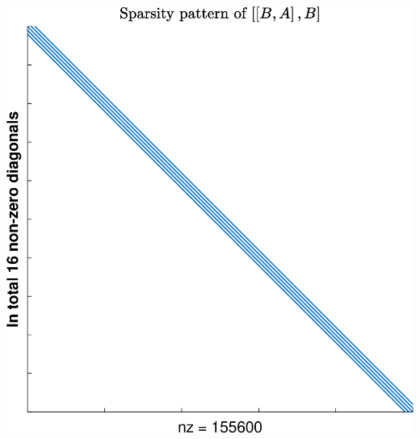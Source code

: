 \begin{minipage}[c][][c]{\linewidth}
\includegraphics[width=.95\columnwidth]{SparsityPatterns/SPP_5}
\end{minipage}

